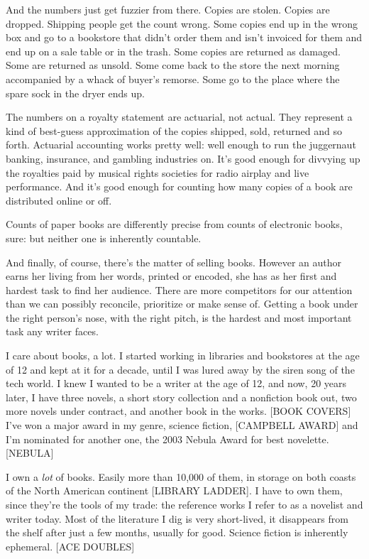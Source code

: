 \begin{enumerate}
  And the numbers just get fuzzier from there. Copies are stolen.
  Copies are dropped. Shipping people get the count wrong. Some
  copies end up in the wrong box and go to a bookstore that didn't
  order them and isn't invoiced for them and end up on a sale table
  or in the trash. Some copies are returned as damaged. Some are
  returned as unsold. Some come back to the store the next morning
  accompanied by a whack of buyer's remorse. Some go to the place
  where the spare sock in the dryer ends up.
  
  The numbers on a royalty statement are actuarial, not actual. They
  represent a kind of best-guess approximation of the copies shipped,
  sold, returned and so forth. Actuarial accounting works pretty
  well: well enough to run the juggernaut banking, insurance, and
  gambling industries on. It's good enough for divvying up the
  royalties paid by musical rights societies for radio airplay and
  live performance. And it's good enough for counting how many copies
  of a book are distributed online or off.
  
  Counts of paper books are differently precise from counts of
  electronic books, sure: but neither one is inherently countable.
  
  And finally, of course, there's the matter of selling books.
  However an author earns her living from her words, printed or
  encoded, she has as her first and hardest task to find her
  audience. There are more competitors for our attention than we can
  possibly reconcile, prioritize or make sense of. Getting a book
  under the right person's nose, with the right pitch, is the hardest
  and most important task any writer faces.
  
\end{enumerate}

I care about books, a lot. I started working in libraries and
bookstores at the age of 12 and kept at it for a decade, until I
was lured away by the siren song of the tech world. I knew I wanted
to be a writer at the age of 12, and now, 20 years later, I have
three novels, a short story collection and a nonfiction book out,
two more novels under contract, and another book in the works.
[BOOK COVERS] I've won a major award in my genre, science fiction,
[CAMPBELL AWARD] and I'm nominated for another one, the 2003 Nebula
Award for best novelette. [NEBULA]

I own a \emph{lot} of books. Easily more than 10,000 of them, in
storage on both coasts of the North American continent [LIBRARY
LADDER]. I have to own them, since they're the tools of my trade:
the reference works I refer to as a novelist and writer today. Most
of the literature I dig is very short-lived, it disappears from the
shelf after just a few months, usually for good. Science fiction is
inherently ephemeral. [ACE DOUBLES]

